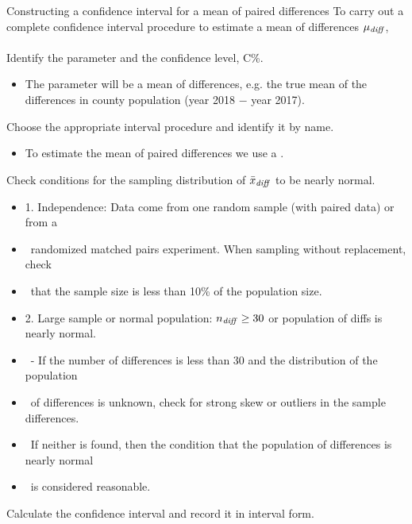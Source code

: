 \begin{onebox}{Constructing a confidence interval for a mean of paired differences}
To carry out a complete confidence interval procedure to estimate a mean of differences $\mu_{\text{\emph{diff}}}$,
\\
\\
 Identify the parameter and the confidence level, C\%.\vspace{-1mm}
\begin{itemize} 
\item[] The parameter will be a mean of differences, e.g. the true mean of the differences in county population (year 2018 $-$ year 2017).  
\end{itemize}
 Choose the appropriate interval procedure and identify it by name. \vspace{-1mm}
\begin{itemize}
\item[] To estimate the mean of paired differences we use a .
\end{itemize}
 Check conditions for the sampling distribution of $\bar{x}_{\text{\emph{diff}}}$ to be nearly normal.\vspace{-1mm}
\begin{itemize}
\setlength{\itemsep}{0mm}
\item[] 1. Independence:  Data come from one random sample (with paired data) or from a 
\item[] \ \quad randomized matched pairs experiment.  When sampling without replacement, check 
\item[] \ \quad that the sample size is less than 10\% of the population size.
\item[] 2. Large sample or normal population:  $n_{\text{\emph{diff}}}\ge 30$ or population of diffs is nearly normal.
 \item[] \quad \  - If the number of differences is less than 30 and the distribution of the population 
 \item[] \quad \ of differences is unknown, check for strong skew or outliers in the sample differences.
\item[] \quad \ If neither is found, then the condition that the population of differences is nearly normal 
\item[] \quad \ is considered reasonable.  
\end{itemize}
  Calculate the confidence interval and record it in interval form.

\end{onebox}
